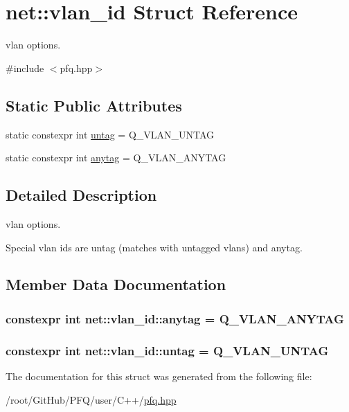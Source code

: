 \hypertarget{structnet_1_1vlan__id}{\section{net\-:\-:vlan\-\_\-id Struct Reference}
\label{structnet_1_1vlan__id}
}


vlan options.  




{\ttfamily \#include $<$pfq.\-hpp$>$}

\subsection*{Static Public Attributes}
\begin{DoxyCompactItemize}
\item 
static constexpr int \hyperlink{structnet_1_1vlan__id_a266d270ff167bffcc68b5baf3fa1254f}{untag} = Q\-\_\-\-V\-L\-A\-N\-\_\-\-U\-N\-T\-A\-G
\item 
static constexpr int \hyperlink{structnet_1_1vlan__id_a020dfecb6821c57a45437f534256d712}{anytag} = Q\-\_\-\-V\-L\-A\-N\-\_\-\-A\-N\-Y\-T\-A\-G
\end{DoxyCompactItemize}


\subsection{Detailed Description}
vlan options. 

Special vlan ids are untag (matches with untagged vlans) and anytag. 

\subsection{Member Data Documentation}
\hypertarget{structnet_1_1vlan__id_a020dfecb6821c57a45437f534256d712}{
\subsubsection[{anytag}]{\setlength{\rightskip}{0pt plus 5cm}constexpr int net\-::vlan\-\_\-id\-::anytag = Q\-\_\-\-V\-L\-A\-N\-\_\-\-A\-N\-Y\-T\-A\-G\hspace{0.3cm}{\ttfamily [static]}}}\label{structnet_1_1vlan__id_a020dfecb6821c57a45437f534256d712}
\hypertarget{structnet_1_1vlan__id_a266d270ff167bffcc68b5baf3fa1254f}{
\subsubsection[{untag}]{\setlength{\rightskip}{0pt plus 5cm}constexpr int net\-::vlan\-\_\-id\-::untag = Q\-\_\-\-V\-L\-A\-N\-\_\-\-U\-N\-T\-A\-G\hspace{0.3cm}{\ttfamily [static]}}}\label{structnet_1_1vlan__id_a266d270ff167bffcc68b5baf3fa1254f}


The documentation for this struct was generated from the following file\-:\begin{DoxyCompactItemize}
\item 
/root/\-Git\-Hub/\-P\-F\-Q/user/\-C++/\hyperlink{pfq_8hpp}{pfq.\-hpp}\end{DoxyCompactItemize}
